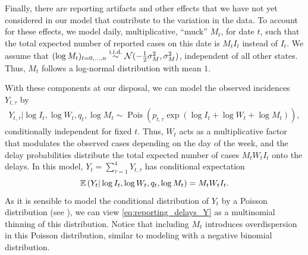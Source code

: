 Finally, there are reporting artifacts and other effects that we have not yet considered in our model that contribute to the variation in the data. To account for these effects, we model daily, multiplicative, ``{}muck''{} $M_{t}$, for date $t$, such that the total expected number of reported cases on this date is $M_{t}I_{t}$ instead of $I_{t}$. We assume that $(\log M_{t})_{t = 0, \dots, n} \stackrel{\text{i.i.d.}}{\sim} \mathcal N(-\frac{1}{2}\sigma^{2}_M, \sigma^{2}_{M})$, independent of all other states. Thus, $M_{t}$ follows a log-normal distribution with mean $1$. 

With these components at our disposal, we can model the observed incidences $Y_{t, \tau}$ by
\begin{align}
    \label{eq:reporting_delays_Y}
    Y_{t, \tau} | \log I_{t}, \log W_{t}, q_{t}, \log M_{t} \sim \operatorname{Pois} \left( p_{t, \tau}\exp \left(\log I_{t} + \log W_{t}  + \log M_{t}\right) \right),
\end{align}
conditionally independent for fixed $t$. Thus, $W_{t}$ acts as a multiplicative factor that modulates the observed cases depending on the day of the week, and the delay probabilities distribute the total expected number of cases $M_{t}W_{t}I_{t}$ onto the delays. In this model, $Y_{t} = \sum_{\tau = 1}^4 Y_{t, \tau}$ has conditional expectation 
$$
    \mathbb E \left( Y_{t} | \log I_{t}, \log W_{t}, q_{t}, \log M_{t} \right) = M_{t}W_{t}I_t.
$$
As it is sensible to model the conditional distribution of $Y_{t}$ by a Poisson distribution (see ), we can view \eqref{eq:reporting_delays_Y} as a multinomial thinning of this distribution. Notice that including $M_{t}$ introduces overdispersion in this Poisson distribution, similar to modeling with a negative binomial distribution. 

